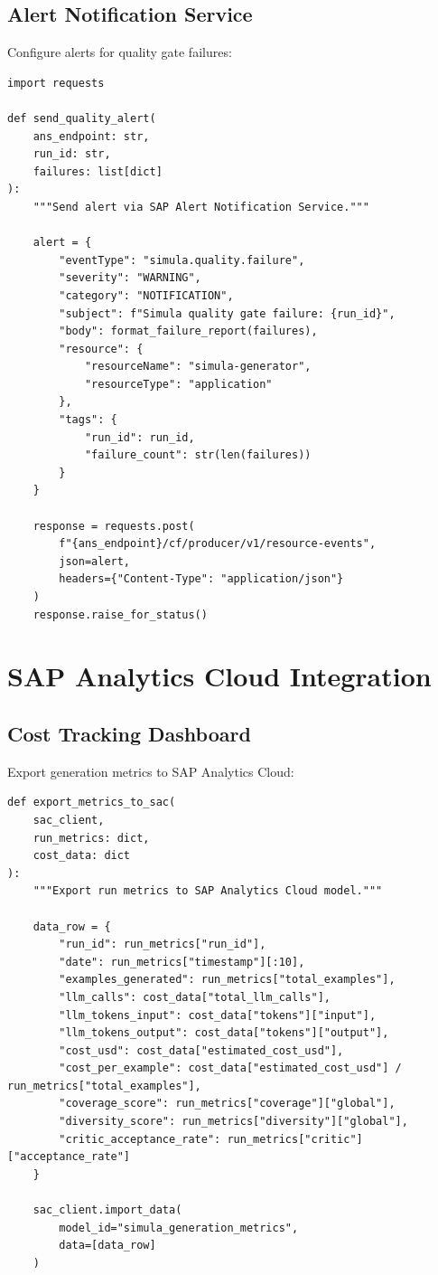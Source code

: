 \subsection{Alert Notification Service}

Configure alerts for quality gate failures:

\begin{lstlisting}[language=jsonx,caption={Alert notification for quality failures}]
import requests

def send_quality_alert(
    ans_endpoint: str,
    run_id: str,
    failures: list[dict]
):
    """Send alert via SAP Alert Notification Service."""
    
    alert = {
        "eventType": "simula.quality.failure",
        "severity": "WARNING",
        "category": "NOTIFICATION",
        "subject": f"Simula quality gate failure: {run_id}",
        "body": format_failure_report(failures),
        "resource": {
            "resourceName": "simula-generator",
            "resourceType": "application"
        },
        "tags": {
            "run_id": run_id,
            "failure_count": str(len(failures))
        }
    }
    
    response = requests.post(
        f"{ans_endpoint}/cf/producer/v1/resource-events",
        json=alert,
        headers={"Content-Type": "application/json"}
    )
    response.raise_for_status()
\end{lstlisting}


\section{SAP Analytics Cloud Integration}

\subsection{Cost Tracking Dashboard}

Export generation metrics to SAP Analytics Cloud:

\begin{lstlisting}[language=jsonx,caption={Exporting metrics to Analytics Cloud}]
def export_metrics_to_sac(
    sac_client,
    run_metrics: dict,
    cost_data: dict
):
    """Export run metrics to SAP Analytics Cloud model."""
    
    data_row = {
        "run_id": run_metrics["run_id"],
        "date": run_metrics["timestamp"][:10],
        "examples_generated": run_metrics["total_examples"],
        "llm_calls": cost_data["total_llm_calls"],
        "llm_tokens_input": cost_data["tokens"]["input"],
        "llm_tokens_output": cost_data["tokens"]["output"],
        "cost_usd": cost_data["estimated_cost_usd"],
        "cost_per_example": cost_data["estimated_cost_usd"] / run_metrics["total_examples"],
        "coverage_score": run_metrics["coverage"]["global"],
        "diversity_score": run_metrics["diversity"]["global"],
        "critic_acceptance_rate": run_metrics["critic"]["acceptance_rate"]
    }
    
    sac_client.import_data(
        model_id="simula_generation_metrics",
        data=[data_row]
    )
\end{lstlisting}

